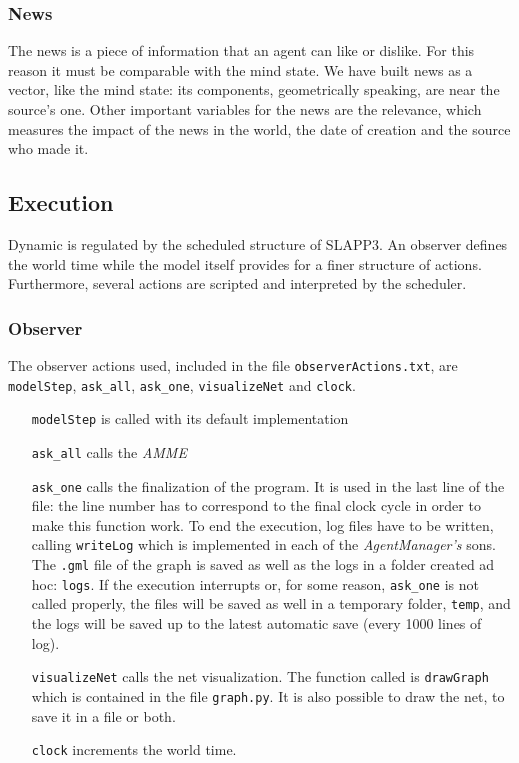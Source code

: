 \subsubsection{News}
The news is a piece of information that an agent can like or dislike.
For this reason it must be comparable with the mind state.
We have built news as a vector, like the mind state:
its components, geometrically speaking, are near the source's one.
Other important variables for the news are the relevance,
which measures the impact of the news in the world, the
date of creation and the source who made it.

\subsection{Execution}
Dynamic is regulated by the scheduled structure of SLAPP3. An observer defines
the world time while the model itself provides for a finer structure of
actions. Furthermore, several actions are scripted and interpreted by
the scheduler.

\subsubsection{Observer}
The observer actions used, included in the file \texttt{observerActions.txt},
are \texttt{modelStep}, \texttt{ask\_all}, \texttt{ask\_one},
\texttt{visualizeNet} and \texttt{clock}.
\begin{itemize}
\item [\texttt{modelStep}] is called with its default implementation
\item [\texttt{ask\_all}] calls the \textit{AMME}
\item [\texttt{ask\_one}] calls the finalization of the program. It
  is used in the last line of the file: the line number has to correspond
  to the final clock cycle in order to make this function work.
  To end the execution, log files have to be written, calling
  \texttt{writeLog} which is implemented in each of the \textit{AgentManager's}
  sons. The \texttt{.gml} file of the graph is saved as well as the logs
  in a folder created ad hoc: \texttt{logs}.
  If the execution interrupts or, for some reason, \texttt{ask\_one} is not
  called properly, the files will be saved as well in a temporary folder,
  \texttt{temp}, and the logs will be saved up to the latest
  automatic save (every 1000 lines of log).
\item [\texttt{visualizeNet}] calls the net visualization. The function called
  is \texttt{drawGraph} which is contained in the file \texttt{graph.py}.
  It is also possible to draw the net, to save it in a file or both.
\item [\texttt{clock}] increments the world time.
\end{itemize}

